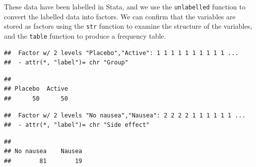 \documentclass[
]{memoir}
\newenvironment{Shaded}{\begin{snugshade}}{\end{snugshade}}
\newcommand{\FunctionTok}[1]{\textcolor[rgb]{0.00,0.00,0.00}{#1}}
\newcommand{\NormalTok}[1]{#1}
\newcommand{\SpecialCharTok}[1]{\textcolor[rgb]{0.00,0.00,0.00}{#1}}
\begin{document}
These data have been labelled in Stata, and we use the \texttt{unlabelled} function to convert the labelled data into factors. We can confirm that the variables are stored as factors using the \texttt{str} function to examine the structure of the variables, and the \texttt{table} function to produce a frequency table.

\begin{Shaded}
\end{Shaded}

\begin{verbatim}
##  Factor w/ 2 levels "Placebo","Active": 1 1 1 1 1 1 1 1 1 1 ...
##  - attr(*, "label")= chr "Group"
\end{verbatim}

\begin{Shaded}
\end{Shaded}

\begin{verbatim}
## 
## Placebo  Active 
##      50      50
\end{verbatim}

\begin{Shaded}
\end{Shaded}

\begin{verbatim}
##  Factor w/ 2 levels "No nausea","Nausea": 2 2 2 2 1 1 1 1 1 1 ...
##  - attr(*, "label")= chr "Side effect"
\end{verbatim}

\begin{Shaded}
\end{Shaded}

\begin{verbatim}
## 
## No nausea    Nausea 
##        81        19
\end{verbatim}
\end{document}
